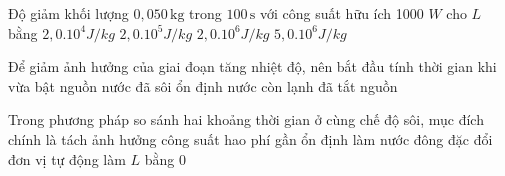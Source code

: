 \begin{ex}
Độ giảm khối lượng $0,050\,\text{kg}$ trong $100\,\text{s}$ với công suất hữu ích 1000 $W$ cho $L$ bằng
\choice
{$2,0.10^4 J/kg$}
{$2,0.10^5 J/kg$}
{\True $2,0.10^6 J/kg$}
{$5,0.10^6 J/kg$}
\end{ex}

\begin{ex}
Để giảm ảnh hưởng của giai đoạn tăng nhiệt độ, nên bắt đầu tính thời gian khi
\choice
{vừa bật nguồn}
{\True nước đã sôi ổn định}
{nước còn lạnh}
{đã tắt nguồn}
\end{ex}

\begin{ex}
Trong phương pháp so sánh hai khoảng thời gian ở cùng chế độ sôi, mục đích chính là
\choice
{\True tách ảnh hưởng công suất hao phí gần ổn định}
{làm nước đông đặc}
{đổi đơn vị tự động}
{làm $L$ bằng 0}
\end{ex}
